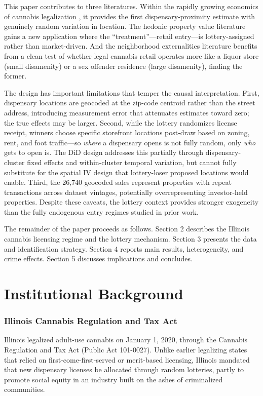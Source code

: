 \documentclass[12pt]{article}
\begin{document}
This paper contributes to three literatures. Within the rapidly growing economics of cannabis legalization \citep{andersenrees2023, dills2021, hansenweb2020}, it provides the first dispensary-proximity estimate with genuinely random variation in location. The hedonic property value literature \citep{rosen1974, lindenrockoff2008, pope2008} gains a new application where the ``treatment''---retail entry---is lottery-assigned rather than market-driven. And the neighborhood externalities literature benefits from a clean test of whether legal cannabis retail operates more like a liquor store (small disamenity) or a sex offender residence (large disamenity), finding the former.

The design has important limitations that temper the causal interpretation. First, dispensary locations are geocoded at the zip-code centroid rather than the street address, introducing measurement error that attenuates estimates toward zero; the true effects may be larger. Second, while the lottery randomizes license receipt, winners choose specific storefront locations post-draw based on zoning, rent, and foot traffic---so \textit{where} a dispensary opens is not fully random, only \textit{who} gets to open is. The DiD design addresses this partially through dispensary-cluster fixed effects and within-cluster temporal variation, but cannot fully substitute for the spatial IV design that lottery-loser proposed locations would enable. Third, the 26,740 geocoded sales represent properties with repeat transactions across dataset vintages, potentially overrepresenting investor-held properties. Despite these caveats, the lottery context provides stronger exogeneity than the fully endogenous entry regimes studied in prior work.

The remainder of the paper proceeds as follows. Section 2 describes the Illinois cannabis licensing regime and the lottery mechanism. Section 3 presents the data and identification strategy. Section 4 reports main results, heterogeneity, and crime effects. Section 5 discusses implications and concludes.


\section{Institutional Background}

\subsubsection*{Illinois Cannabis Regulation and Tax Act} Illinois legalized adult-use cannabis on January 1, 2020, through the Cannabis Regulation and Tax Act (Public Act 101-0027). Unlike earlier legalizing states that relied on first-come-first-served or merit-based licensing, Illinois mandated that new dispensary licenses be allocated through random lotteries, partly to promote social equity in an industry built on the ashes of criminalized communities.
\end{document}
